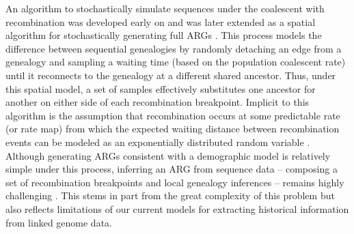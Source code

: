\documentclass[11pt]{article}
\begin{document}
An algorithm to stochastically simulate sequences under the coalescent with 
recombination was developed early on \citep{hudson1983properties} 
and was later extended as a spatial algorithm for stochastically generating full 
ARGs \citep{wiuf_recombination_1999}. 
This process models the difference between sequential genealogies by 
randomly detaching an edge from a genealogy and sampling
a waiting time (based on the population coalescent rate) until it reconnects
to the genealogy at a different shared ancestor.
Thus, under this spatial model, a set of samples effectively substitutes
one ancestor for another on either side of each recombination breakpoint.
Implicit to this algorithm is the assumption that recombination 
occurs at some predictable rate (or rate map) from which the expected 
waiting distance between recombination events can be modeled as an 
exponentially distributed random variable \citep{wiuf_recombination_1999}.
Although generating ARGs consistent with a demographic model is 
relatively simple under this process, inferring an ARG from sequence data 
-- composing a set of recombination breakpoints and local genealogy inferences -- 
remains highly challenging \citep{y_c_brandt_evaluation_2022}.
This stems in part from the great complexity of this problem 
but also reflects limitations of our current models for 
extracting historical information from linked genome data.
\end{document}
